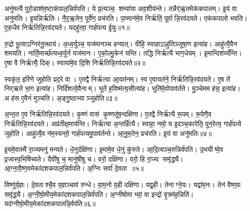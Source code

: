 



\clearpage
{}
\setcounter{anuvakam}{0}
अनु॑मत्यै पुरो॒डाश॑म॒ष्टाक॑पाल॒न्निर्व॑पति। ये प्र॒त्यञ्च॒ शम्या॑या अव॒शीय॑न्ते। तन्नैर्॑ऋ॒तमेक॑कपालम्। इ॒यं वा अनु॑मतिः। इ॒यन्निर्\mbox{}ऋ॑तिः। नै॒र्॒ऋ॒तेन॒ पूर्वे॑ण॒ प्रच॑रति। पा॒प्मान॑मे॒व निर्\mbox{}ऋ॑तिं॒ पूर्वान्नि॒रव॑दयते। एक॑कपालो भवति। ए॒क॒धैव निर्\mbox{}ऋ॑तिन्नि॒रव॑दयते। यदहु॑त्वा॒ गार्\mbox{}ह॑पत्य ई॒युः॥१॥

रु॒द्रो भू॒त्वाऽग्निर॑नू॒त्थाय॑। अ॒ध्व॒र्युञ्च॒ यज॑मानञ्च हन्यात्। वीहि॒ स्वाहाऽऽहु॑तिञ्जुषा॒ण इत्या॑ह। आहु॑त्यै॒वैन शमयति। नार्ति॒मार्च्छ॑त्यध्व॒र्युर्न यज॑मानः। ए॒को॒ल्मु॒केन॑ यन्ति। तद्धि निर्\mbox{}ऋ॑त्यै भाग॒धेयम्। इ॒मान्दिश॑य्यँन्ति। ए॒षा वै निर्\mbox{}ऋ॑त्यै॒ दिक्। स्वाया॑मे॒व दि॒शि निर्\mbox{}ऋ॑तिन्नि॒रव॑दयते॥२॥

स्वकृ॑त॒ इरि॑णे जुहोति प्रद॒रे वा। ए॒तद्वै निर्\mbox{}ऋ॑त्या आ॒यत॑नम्। स्व ए॒वायत॑ने॒ निर्\mbox{}ऋ॑तिन्नि॒रव॑दयते। ए॒ष ते॑ निर्‌ऋते भा॒ग इत्या॑ह। निर्दि॑शत्ये॒वैनाम्। भूते॑ ह॒विष्म॑त्य॒सीत्या॑ह। भूति॑मे॒वोपाव॑र्तते। मु॒ञ्चेममह॑स॒ इत्या॑ह। अह॑स ए॒वैनं॑ मुञ्चति। अ॒ङ्गु॒ष्ठाभ्याञ्जुहोति॥३॥

अ॒न्त॒त ए॒व निर्\mbox{}ऋ॑तिन्नि॒रव॑दयते। कृ॒ष्णं वास॑ कृ॒ष्णतू॑ष॒न्दक्षि॑णा। ए॒तद्वै निर्\mbox{}ऋ॑त्यै रू॒पम्। रू॒पेणै॒व निर्\mbox{}ऋ॑तिन्नि॒रव॑दयते। अप्र॑तीक्ष॒माय॑न्ति। निर्\mbox{}ऋ॑त्या अ॒न्तर्\mbox{}हि॑त्यै। स्वाहा॒ नमो॒ य इ॒दञ्च॒कारेति॒ पुन॒रेत्य॒ गार्\mbox{}ह॑पत्ये जुहोति। आहु॑त्यै॒व न॑म॒स्यन्तो॒ गार्\mbox{}ह॑पत्यमु॒पाव॑र्तन्ते। आ॒नु॒म॒तेन॒ प्रच॑रति। इ॒यं वा अनु॑मतिः॥४॥

इ॒यमे॒वास्मै॑ रा॒ज्यमनु॑ मन्यते। धे॒नुर्दक्षि॑णा। इ॒मामे॒व धे॒नुं कु॑रुते। आ॒दि॒त्यञ्च॒रुन्निर्व॑पति। उ॒भयीष्वे॒व प्र॒जास्व॒भिषि॑च्यते। दैवी॑षु च॒ मानु॑षीषु च। वरो॒ दक्षि॑णा। वरो॒ हि रा॒ज्य समृ॑द्ध्यै। आ॒ग्ना॒वै॒ष्ण॒वमेका॑दशकपाल॒न्निर्व॑पति। अ॒ग्निः सर्वा॑ दे॒वता॥५॥

विष्णु॑र्य॒ज्ञः। दे॒वताश्चै॒व य॒ज्ञञ्चाव॑ रुन्धे। वा॒म॒नो व॒ही दक्षि॑णा। यद्व॒ही। तेनाग्ने॒यः। यद्वा॑म॒नः। तेन॑ वैष्ण॒वः समृ॑द्ध्यै। अ॒ग्नी॒षो॒मीय॒मेका॑दशकपाल॒न्निर्व॑पति। अ॒ग्नीषोमाभ्यां॒ वा इन्द्रो॑ वृ॒त्रम॑ह॒न्निति॑। यद॑ग्नीषो॒मीय॒मेका॑दशकपालन्नि॒र्वप॑ति॥६॥


